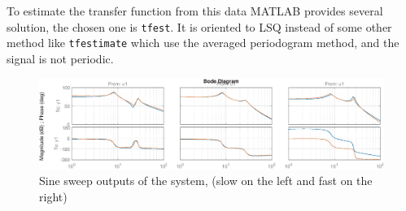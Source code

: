 \documentclass[twosided,a4paper]{article}           %
\begin{document}
To estimate the transfer function from this data MATLAB provides several solution, the chosen one is
\texttt{tfest}. It is oriented to LSQ instead of some other method like \texttt{tfestimate}  which use the averaged periodogram method, and the signal is not periodic.
\begin{figure}[H]
	\centering
	\includegraphics[width=\linewidth]{img/ssbode1}
	\caption{Sine sweep outputs of the system, (slow on the left and fast on the right)}
	\label{fig:ssbode1}
\end{figure}









\end{document}

